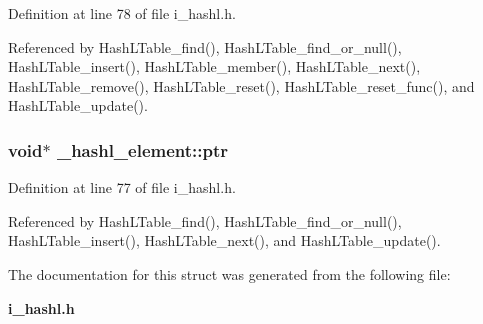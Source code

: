 Definition at line 78 of file i\_\-hashl.h.

Referenced by Hash\-LTable\_\-find(), Hash\-LTable\_\-find\_\-or\_\-null(), Hash\-LTable\_\-insert(), Hash\-LTable\_\-member(), Hash\-LTable\_\-next(), Hash\-LTable\_\-remove(), Hash\-LTable\_\-reset(), Hash\-LTable\_\-reset\_\-func(), and Hash\-LTable\_\-update().
\subsubsection{\setlength{\rightskip}{0pt plus 5cm}void$\ast$ \bf{\_\-hashl\_\-element::ptr}}\label{struct__hashl__element_c955ecbf0e943d75cb2d20467b5635c1}




Definition at line 77 of file i\_\-hashl.h.

Referenced by Hash\-LTable\_\-find(), Hash\-LTable\_\-find\_\-or\_\-null(), Hash\-LTable\_\-insert(), Hash\-LTable\_\-next(), and Hash\-LTable\_\-update().

The documentation for this struct was generated from the following file:\begin{CompactItemize}
\item 
\bf{i\_\-hashl.h}\end{CompactItemize}
